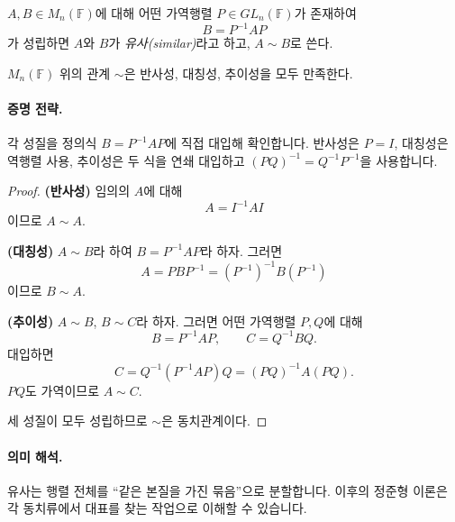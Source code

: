 
\begin{definition}
$A,B\in M_n(\mathbb F)$에 대해 어떤 가역행렬 $P\in GL_n(\mathbb F)$가 존재하여
$$
B=P^{-1}AP
$$
가 성립하면 $A$와 $B$가 \emph{유사(similar)}라고 하고, $A\sim B$로 쓴다.
\end{definition}

\begin{theorem}
$M_n(\mathbb F)$ 위의 관계 $\sim$은 반사성, 대칭성, 추이성을 모두 만족한다.
\end{theorem}

\paragraph{증명 전략.}
각 성질을 정의식 $B=P^{-1}AP$에 직접 대입해 확인합니다. 반사성은 $P=I$, 대칭성은 역행렬 사용, 추이성은 두 식을 연쇄 대입하고 $(PQ)^{-1}=Q^{-1}P^{-1}$을 사용합니다.

\begin{proof}
\textbf{(반사성)} 임의의 $A$에 대해
$$
A=I^{-1}AI
$$
이므로 $A\sim A$.

\textbf{(대칭성)} $A\sim B$라 하여 $B=P^{-1}AP$라 하자. 그러면
$$
A=PBP^{-1}=(P^{-1})^{-1}B(P^{-1})
$$
이므로 $B\sim A$.

\textbf{(추이성)} $A\sim B$, $B\sim C$라 하자. 그러면 어떤 가역행렬 $P,Q$에 대해
$$
B=P^{-1}AP,\qquad C=Q^{-1}BQ.
$$
대입하면
$$
C=Q^{-1}(P^{-1}AP)Q=(PQ)^{-1}A(PQ).
$$
$PQ$도 가역이므로 $A\sim C$.

세 성질이 모두 성립하므로 $\sim$은 동치관계이다.
\end{proof}

\paragraph{의미 해석.}
유사는 행렬 전체를 ``같은 본질을 가진 묶음''으로 분할합니다. 이후의 정준형 이론은 각 동치류에서 대표를 찾는 작업으로 이해할 수 있습니다.

